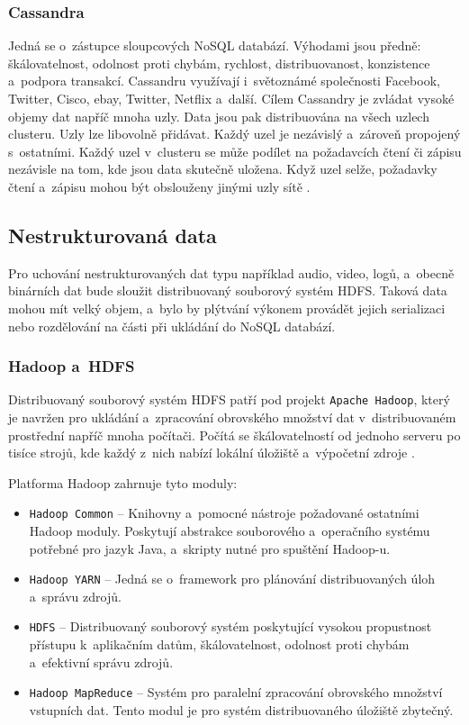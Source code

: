\subsubsection{Cassandra}
Jedná se o~zástupce sloupcových NoSQL databází. Výhodami jsou předně: škálovatelnost, odolnost proti chybám, rychlost, distribuovanost, konzistence a~podpora transakcí. Cassandru využívají i~světoznámé společnosti Facebook, Twitter, Cisco, ebay, Twitter, Netflix a~další. Cílem Cassandry je zvládat vysoké objemy dat napříč mnoha uzly. Data jsou pak distribuována na všech uzlech clusteru. Uzly lze libovolně přidávat. Každý uzel je nezávislý a~zároveň propojený s~ostatními. Každý uzel v~clusteru se může podílet na požadavcích čtení či zápisu nezávisle na tom, kde jsou data skutečně uložena. Když uzel selže, požadavky čtení a~zápisu mohou být obslouženy jinými uzly sítě \cite{cassandraTutorialsPoint}.

\subsection{Nestrukturovaná data}
Pro uchování nestrukturovaných dat typu například audio, video, logů, a~obecně binárních dat bude sloužit distribuovaný souborový systém HDFS. Taková data mohou mít velký objem, a~bylo by plýtvání výkonem provádět jejich serializaci nebo rozdělování na části při ukládání do NoSQL databází.

\subsubsection{Hadoop a~HDFS}
Distribuovaný souborový systém HDFS patří pod projekt \texttt{Apache Hadoop}, který je navržen pro ukládání a~zpracování obrovského množství dat v~distribuovaném prostřední napříč mnoha počítači. Počítá se škálovatelností od jednoho serveru po tisíce strojů, kde každý z~nich nabízí lokální úložiště a~výpočetní zdroje \cite{hadoopTutorialsPoint}.

\vspace{0.5cm}
\noindent Platforma Hadoop zahrnuje tyto moduly:

\begin{itemize}
    \item \texttt{Hadoop Common} -- Knihovny a~pomocné nástroje požadované ostatními Hadoop moduly. Poskytují abstrakce souborového a~operačního systému potřebné pro jazyk Java, a~skripty nutné pro spuštění Hadoop-u.
    
    \item \texttt{Hadoop YARN} -- Jedná se o~framework pro plánování distribuovaných úloh a~správu zdrojů.
    
    \item \texttt{HDFS} -- Distribuovaný souborový systém poskytující vysokou propustnost přístupu k~aplikačním datům, škálovatelnost, odolnost proti chybám a~efektivní správu zdrojů.
    
    \item \texttt{Hadoop MapReduce} -- Systém pro paralelní zpracování obrovského množství vstupních dat. Tento modul je pro systém distribuovaného úložiště zbytečný.
\end{itemize}

